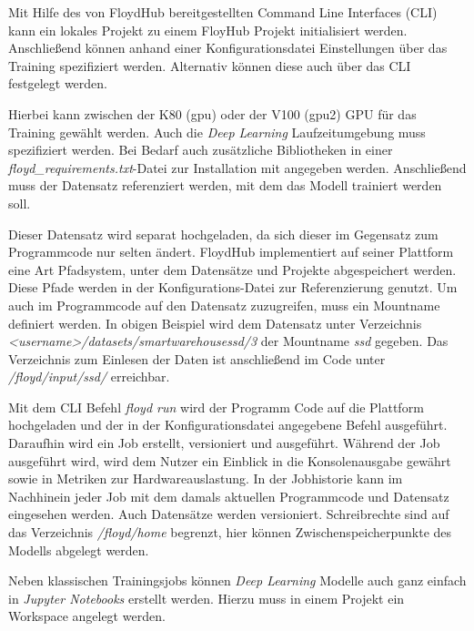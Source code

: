 Mit Hilfe des von FloydHub bereitgestellten Command Line Interfaces (CLI) kann ein lokales Projekt zu einem FloyHub Projekt initialisiert werden. Anschließend können anhand einer Konfigurationsdatei Einstellungen über das Training spezifiziert werden. Alternativ können diese auch über das CLI festgelegt werden. 

\lstset{language=XML}


Hierbei kann zwischen der K80 (gpu) oder der V100 (gpu2) GPU für das Training gewählt werden. Auch die \textit{Deep Learning} Laufzeitumgebung muss spezifiziert werden. Bei Bedarf auch zusätzliche Bibliotheken in einer \textit{floyd\_requirements.txt}-Datei zur Installation mit angegeben werden. Anschließend muss der Datensatz referenziert werden, mit dem das Modell trainiert werden soll. 

Dieser Datensatz wird separat hochgeladen, da sich dieser im Gegensatz zum Programmcode nur selten ändert. FloydHub implementiert auf seiner Plattform eine Art Pfadsystem, unter dem Datensätze und Projekte abgespeichert werden. Diese Pfade werden in der Konfigurations-Datei zur Referenzierung genutzt. Um auch im Programmcode auf den Datensatz zuzugreifen, muss ein Mountname definiert werden. In obigen Beispiel wird dem Datensatz unter Verzeichnis \textit{<username>/datasets/smartwarehousessd/3} der Mountname \textit{ssd} gegeben. Das Verzeichnis zum Einlesen der Daten ist anschließend im Code unter \textit{/floyd/input/ssd/} erreichbar. 

Mit dem CLI Befehl \textit{floyd run} wird der Programm Code auf die Plattform hochgeladen und der in der Konfigurationsdatei angegebene Befehl ausgeführt. Daraufhin wird ein Job erstellt, versioniert und ausgeführt. Während der Job ausgeführt wird, wird dem Nutzer ein Einblick in die Konsolenausgabe gewährt sowie in Metriken zur Hardwareauslastung. In der Jobhistorie kann im Nachhinein jeder Job mit dem damals aktuellen Programmcode und Datensatz eingesehen werden. Auch Datensätze werden versioniert. Schreibrechte sind auf das Verzeichnis \textit{/floyd/home} begrenzt, hier können Zwischenspeicherpunkte des Modells abgelegt werden. 

Neben klassischen Trainingsjobs können \textit{Deep Learning} Modelle auch ganz einfach in \textit{Jupyter Notebooks} erstellt werden. Hierzu muss in einem Projekt ein Workspace angelegt werden.

